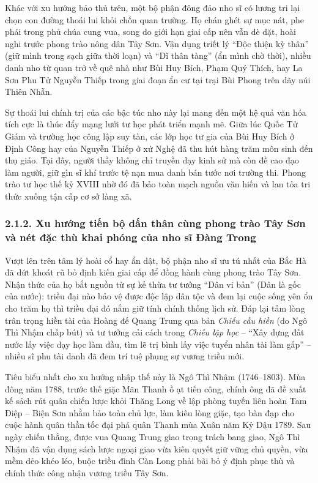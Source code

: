 Khác với xu hướng bảo thủ trên, một bộ phận đông đảo nho sĩ có lương tri lại chọn con đường thoái lui khỏi chốn quan trường. Họ chán ghét sự mục nát, phe phái trong phủ chúa cung vua, song do giới hạn giai cấp nên vẫn dè dặt, hoài nghi trước phong trào nông dân Tây Sơn. Vận dụng triết lý ``Độc thiện kỳ thân'' (giữ mình trong sạch giữa thời loạn) và ``Dĩ thân tàng'' (ẩn mình chờ thời), nhiều danh nho từ quan trở về quê nhà như Bùi Huy Bích, Phạm Quý Thích, hay La Sơn Phu Tử Nguyễn Thiếp trong giai đoạn ẩn cư tại trại Bùi Phong trên dãy núi Thiên Nhẫn.

Sự thoái lui chính trị của các bậc túc nho này lại mang đến một hệ quả văn hóa tích cực là thúc đẩy mạng lưới tư học phát triển mạnh mẽ. Giữa lúc Quốc Tử Giám và trường học công lập suy tàn, các lớp học tư gia của Bùi Huy Bích ở Định Công hay của Nguyễn Thiếp ở xứ Nghệ đã thu hút hàng trăm môn sinh đến thụ giáo. Tại đây, người thầy không chỉ truyền dạy kinh sử mà còn đề cao đạo làm người, giữ gìn sĩ khí trước tệ nạn mua danh bán tước nơi trường thi. Phong trào tư học thế kỷ XVIII nhờ đó đã bảo toàn mạch nguồn văn hiến và lan tỏa tri thức xuống tận cấp cơ sở làng xã.

\subsubsection*{2.1.2. Xu hướng tiến bộ dấn thân cùng phong trào Tây Sơn và nét đặc thù khai phóng của nho sĩ Đàng Trong}

Vượt lên trên tâm lý hoài cổ hay ẩn dật, bộ phận nho sĩ ưu tú nhất của Bắc Hà đã dứt khoát rũ bỏ định kiến giai cấp để đồng hành cùng phong trào Tây Sơn. Nhận thức của họ bắt nguồn từ sự kế thừa tư tưởng ``Dân vi bản'' (Dân là gốc của nước): triều đại nào bảo vệ được độc lập dân tộc và đem lại cuộc sống yên ổn cho trăm họ thì triều đại đó nắm giữ tính chính thống lịch sử. Đáp lại tấm lòng trân trọng hiền tài của Hoàng đế Quang Trung qua bản \textit{Chiếu cầu hiền} (do Ngô Thì Nhậm chấp bút) và tư tưởng cải cách trong \textit{Chiếu lập học} -- ``Xây dựng đất nước lấy việc dạy học làm đầu, tìm lẽ trị bình lấy việc tuyển nhân tài làm gấp'' -- nhiều sĩ phu tài danh đã đem trí tuệ phụng sự vương triều mới.

Tiêu biểu nhất cho xu hướng nhập thế này là Ngô Thì Nhậm (1746--1803). Mùa đông năm 1788, trước thế giặc Mãn Thanh ồ ạt tiến công, chính ông đã đề xuất kế sách rút quân chiến lược khỏi Thăng Long về lập phòng tuyến liên hoàn Tam Điệp -- Biện Sơn nhằm bảo toàn chủ lực, làm kiêu lòng giặc, tạo bàn đạp cho cuộc hành quân thần tốc đại phá quân Thanh mùa Xuân năm Kỷ Dậu 1789. Sau ngày chiến thắng, được vua Quang Trung giao trọng trách bang giao, Ngô Thì Nhậm đã vận dụng sách lược ngoại giao vừa kiên quyết giữ vững chủ quyền, vừa mềm dẻo khéo léo, buộc triều đình Càn Long phải bãi bỏ ý định phục thù và chính thức công nhận vương triều Tây Sơn.


